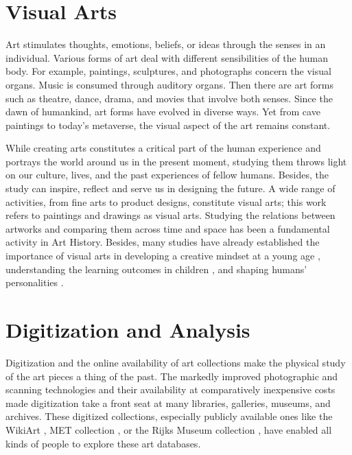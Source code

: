 \section{Visual Arts}

Art stimulates thoughts, emotions, beliefs, or ideas through the senses in an individual. Various forms of art deal with different sensibilities of the human body. For example, paintings, sculptures, and photographs concern the visual organs. Music is consumed through auditory organs. Then there are art forms such as theatre, dance, drama, and movies that involve both senses. Since the dawn of humankind, art forms have evolved in diverse ways. Yet from cave paintings to today’s metaverse, the visual aspect of the art remains constant. 

While creating arts constitutes a critical part of the human experience and portrays the world around us in the present moment, studying them throws light on our culture, lives, and the past experiences of fellow humans. Besides, the study can inspire, reflect and serve us in designing the future. A wide range of activities, from fine arts to product designs, constitute visual arts; this work refers to paintings and drawings as visual arts. Studying the relations between artworks and comparing them across time and space has been a fundamental activity in Art History. Besides, many studies have already established the importance of visual arts in developing a creative mindset at a young age \cite{kamp_2015}, understanding the learning outcomes in children \cite{tyler_2012}, and shaping humans' personalities \cite{kindler_2003}.


\section{Digitization and Analysis}

Digitization and the online availability of art collections make the physical study of the art pieces a thing of the past. The markedly improved photographic and scanning technologies and their availability at comparatively inexpensive costs made digitization take a front seat at many libraries, galleries, museums, and archives. These digitized collections, especially publicly available ones like the WikiArt \cite{wikiart}, MET collection \cite{met_coll}, or the Rijks Museum collection \cite{rijks_coll}, have enabled all kinds of people to explore these art databases. 


